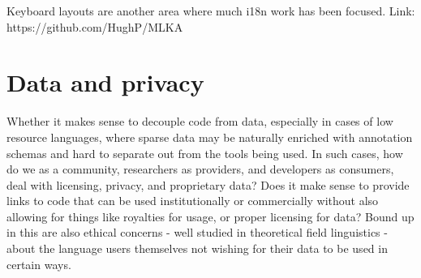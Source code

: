 \documentclass[10pt, a4paper]{article}
\begin{document}
Keyboard layouts are another area where much i18n work has been focused. Link: https://github.com/HughP/MLKA

\section{Data and privacy}

Whether it makes sense to decouple code from data, especially in cases of low resource languages, where sparse data may be naturally enriched with annotation schemas and hard to separate out from the tools being used. In such cases, how do we as a community, researchers as providers, and developers as consumers, deal with licensing, privacy, and proprietary data? Does it make sense to provide links to code that can be used institutionally or commercially without also allowing for things like royalties for usage, or proper licensing for data? Bound up in this are also ethical concerns - well studied in theoretical field linguistics - about the language users themselves not wishing for their data to be used in certain ways.


\end{document}
